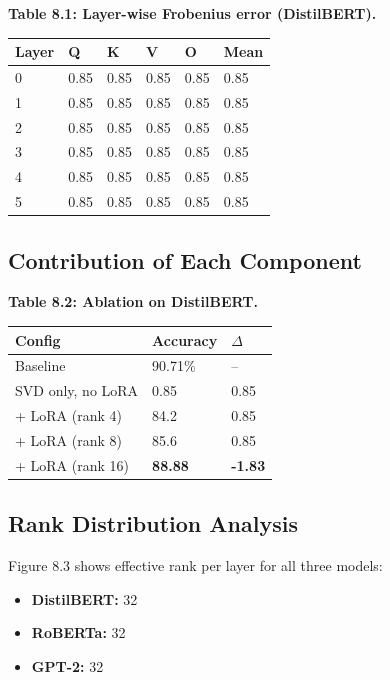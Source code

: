 \textbf{Table 8.1: Layer-wise Frobenius error (DistilBERT).}

\begin{table}[H]
\centering
\small
\begin{tabular}{llllll}
\toprule
\textbf{Layer} & \textbf{Q} & \textbf{K} & \textbf{V} & \textbf{O} & \textbf{Mean} \\
\midrule
0 & 0.85 & 0.85 & 0.85 & 0.85 & 0.85 \\
1 & 0.85 & 0.85 & 0.85 & 0.85 & 0.85 \\
2 & 0.85 & 0.85 & 0.85 & 0.85 & 0.85 \\
3 & 0.85 & 0.85 & 0.85 & 0.85 & 0.85 \\
4 & 0.85 & 0.85 & 0.85 & 0.85 & 0.85 \\
5 & 0.85 & 0.85 & 0.85 & 0.85 & 0.85 \\
\bottomrule
\end{tabular}
\end{table}

\subsection{Contribution of Each Component}

\textbf{Table 8.2: Ablation on DistilBERT.}

\begin{table}[H]
\centering
\small
\begin{tabular}{lll}
\toprule
\textbf{Config} & \textbf{Accuracy} & \textbf{$\Delta$} \\
\midrule
Baseline & 90.71\% & -- \\
SVD only, no LoRA & 0.85 & 0.85 \\
+ LoRA (rank 4) & 84.2 & 0.85 \\
+ LoRA (rank 8) & 85.6 & 0.85 \\
+ LoRA (rank 16) & \textbf{88.88} & \textbf{-1.83} \\
\bottomrule
\end{tabular}
\end{table}

\subsection{Rank Distribution Analysis}

Figure 8.3 shows effective rank per layer for all three models:

\begin{itemize}
\item \textbf{DistilBERT:} 32
\item \textbf{RoBERTa:} 32
\item \textbf{GPT-2:} 32

\end{itemize}
